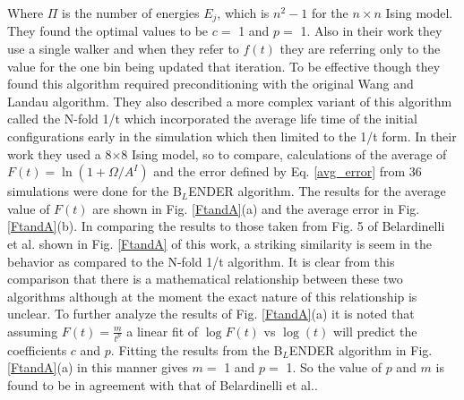 \documentclass[aps,pre,reprint,superscriptaddress,showkeys]{revtex4-1}
\begin{document}
Where $\Pi$ is the number of energies $E_j$, which is ${n^2} -1$ for the $n\times n$  Ising model.   They found the optimal values to be $c=$ 1 and $p=$ 1. Also in their work they use a single walker and when they refer to $f(t)$ they are referring only to the value for the one bin being updated that iteration. To be effective though they found this algorithm required preconditioning with the original Wang and Landau algorithm. They also described a more complex variant of this algorithm called the N-fold 1/t  which incorporated the average life time of the initial configurations early in the simulation which then limited to the 1/t form.  In their work they used a 8$\times$8 Ising model, so to compare, calculations of the average of $F(t)=\ln(1+ \Omega/A^I)$  and the error defined by Eq. \ref{avg_error} from 36 simulations were done for the B$_L$ENDER algorithm.  The results for the average value of $F(t)$ are shown in  Fig. \ref{FtandA}(a) and the average error in Fig. \ref{FtandA}(b). In comparing the results to those taken from Fig. 5 of Belardinelli et al. \cite{saturation} shown in   Fig. \ref{FtandA} of this work, a striking similarity is seem in the behavior as compared to the N-fold 1/t algorithm. It is clear from this comparison that there is a mathematical relationship between these two algorithms although at the moment the exact nature of this relationship is unclear.  To further analyze the results of  Fig. \ref{FtandA}(a) it is noted that assuming $F(t) = \frac{m}{t^p}$  a linear fit of  $\log F(t)$ vs $\log(t)$ will predict the coefficients $c$ and $p$. Fitting the results from the B$_L$ENDER algorithm in Fig. \ref{FtandA}(a) in this manner gives $m=$ 1 and $p=$ 1. So the value of $p$ and $m$ is found to be in agreement with that of Belardinelli et al.. 
\end{document}
